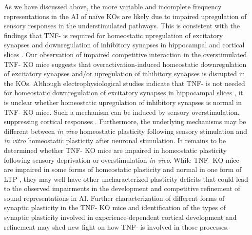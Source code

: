 As we have discussed above, the more variable and incomplete frequency representations in the AI of na\"ive KOs are likely due to impaired upregulation of sensory responses in the understimulated pathways. This is consistent with the findings that TNF-\textalpha{} is required for homeostatic upregulation of excitatory synapses and downregulation of inhibitory synapses in hippocampal and cortical slices \cite{Stellwagen2006, Kaneko2008}. Our observation of impaired competitive interaction in the overstimulated TNF-\textalpha{} KO mice suggests that overactivation-induced homeostatic downregulation of excitatory synapses and/or upregulation of inhibitory synapses is disrupted in the KOs. Although electrophysiological studies indicate that TNF-\textalpha{} is not needed for homeostatic downregulation of excitatory synapses in hippocampal slices \cite{Stellwagen2006}, it is unclear whether homeostatic upregulation of inhibitory synapses is normal in TNF-\textalpha{} KO mice. Such a mechanism can be induced by sensory overstimulation, suppressing cortical responses \cite{Knott2002}. Furthermore, the underlying mechanisms may be different between \textit{in vivo} homeostatic plasticity following sensory stimulation and \textit{in vitro} homeostatic plasticity after neuronal stimulation. It remains to be determined whether TNF-\textalpha{} KO mice are impaired in homeostatic plasticity following sensory deprivation or overstimulation \textit{in vivo}. While TNF-\textalpha{} KO mice are impaired in some forms of homeostatic plasticity and normal in one form of LTP \cite{Stellwagen2006, Kaneko2008}, they may well have other uncharacterized plasticity deficits that could lead to the observed impairments in the development and competitive refinement of sound representations in AI. Further characterization of different forms of synaptic plasticity in the TNF-\textalpha{} KO mice and identification of the types of synaptic plasticity involved in experience-dependent cortical development and refinement may shed new light on how TNF-\textalpha{} is involved in those processes.

